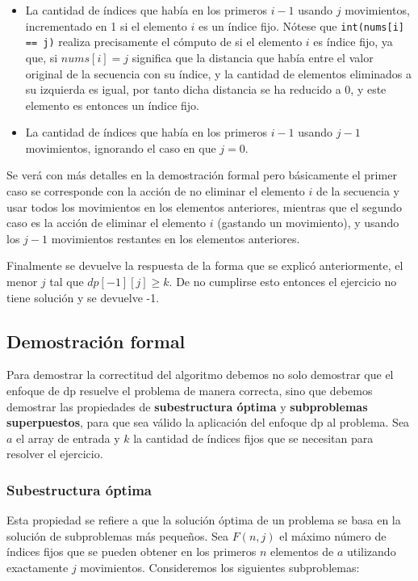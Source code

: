 \documentclass[11pt]{article}
\begin{document}
    \begin{itemize}
        \item La cantidad de índices que había en los primeros $i-1$ usando $j$ movimientos, incrementado en 1 si
              el elemento $i$ es un índice fijo. Nótese que \texttt{int(nums[i] == j)} realiza precisamente el cómputo de
              si el elemento $i$ es índice fijo, ya que, si $nums[i] = j$ significa que la distancia que había entre
              el valor original de la secuencia con su índice, y la cantidad de elementos eliminados a su izquierda es
              igual, por tanto dicha distancia se ha reducido a 0, y este elemento es entonces un índice fijo.
        \item La cantidad de índices que había en los primeros $i-1$ usando $j-1$ movimientos, ignorando el caso en que
              $j=0$.
    \end{itemize}

    Se verá con más detalles en la demostración formal pero básicamente el primer caso se corresponde con la acción de
    no eliminar el elemento $i$ de la secuencia y usar todos los movimientos en los elementos anteriores, mientras que el
    segundo caso es la acción de eliminar el elemento $i$ (gastando un movimiento), y usando los $j-1$ movimientos restantes
    en los elementos anteriores.

    Finalmente se devuelve la respuesta de la forma que se explicó anteriormente, el menor $j$ tal que $dp[-1][j] \geq k$.
    De no cumplirse esto entonces el ejercicio no tiene solución y se devuelve -1.

    \subsection{Demostración formal}
    Para demostrar la correctitud del algoritmo debemos no solo demostrar que el enfoque de dp resuelve el problema
    de manera correcta, sino que debemos demostrar las propiedades de \textbf{subestructura óptima} y
    \textbf{subproblemas superpuestos}, para que sea válido la aplicación del enfoque dp al problema. Sea $a$ el array 
    de entrada y $k$ la cantidad de índices fijos que se necesitan para resolver el ejercicio.

    \subsubsection{Subestructura óptima}
    Esta propiedad se refiere a que la solución óptima de un problema se basa en la solución de subproblemas
    más pequeños. Sea $F(n,j)$ el máximo número de índices fijos que se pueden obtener en los primeros $n$ 
    elementos de $a$ utilizando exactamente $j$ movimientos. Consideremos los siguientes subproblemas:
\end{document}
